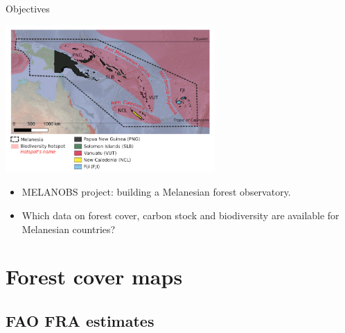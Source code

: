\documentclass[10pt,table,dvipsnames,compress]{beamer}
\begin{document}
\begin{frame}[label={sec:org2fd352f}]{Objectives}
\begin{center}
\includegraphics[width=8cm]{figs/carte_melanobs.jpg}
\end{center}

\begin{itemize}
\item MELANOBS project: building a Melanesian forest observatory.
\item Which data on forest cover, carbon stock and biodiversity are available for Melanesian countries?
\end{itemize}
\end{frame}

\section{Forest cover maps}
\label{sec:org538b747}

\subsection{FAO FRA estimates}
\label{sec:orgb031799}
\end{document}
